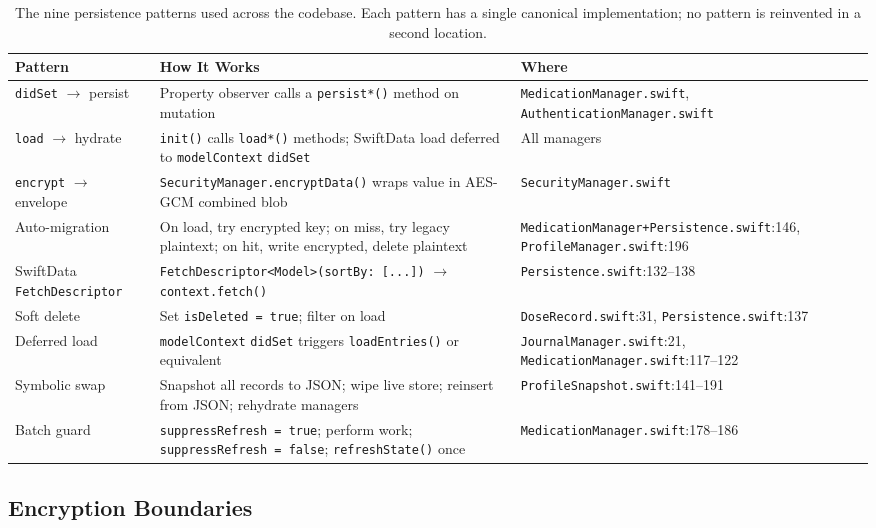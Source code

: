 \documentclass[11pt,a4paper]{article}
\newcommand{\code}[1]{\texttt{\small #1}}
\begin{document}
\begin{table}[h]
\centering
\small
\begin{tabular}{@{}p{3.0cm}p{6.0cm}p{5.5cm}@{}}
\toprule
\textbf{Pattern} & \textbf{How It Works} & \textbf{Where} \\
\midrule
\code{didSet} $\to$ persist &
  Property observer calls a \code{persist*()} method on mutation &
  \code{MedicationManager.swift},
  \code{AuthenticationManager.swift} \\
\code{load} $\to$ hydrate &
  \code{init()} calls \code{load*()} methods; SwiftData load deferred to
  \code{modelContext} \code{didSet} &
  All managers \\
\code{encrypt} $\to$ envelope &
  \code{SecurityManager.encryptData()} wraps value in AES-GCM combined blob &
  \code{SecurityManager.swift} \\
Auto-migration &
  On load, try encrypted key; on miss, try legacy plaintext; on hit,
  write encrypted, delete plaintext &
  \code{MedicationManager+Persistence.swift}:146,
  \code{ProfileManager.swift}:196 \\
SwiftData \code{FetchDescriptor} &
  \code{FetchDescriptor<Model>(sortBy: [...])} $\to$
  \code{context.fetch()} &
  \code{Persistence.swift}:132--138 \\
Soft delete &
  Set \code{isDeleted = true}; filter on load &
  \code{DoseRecord.swift}:31,
  \code{Persistence.swift}:137 \\
Deferred load &
  \code{modelContext} \code{didSet} triggers
  \code{loadEntries()} or equivalent &
  \code{JournalManager.swift}:21,
  \code{MedicationManager.swift}:117--122 \\
Symbolic swap &
  Snapshot all records to JSON; wipe live store; reinsert from JSON;
  rehydrate managers &
  \code{ProfileSnapshot.swift}:141--191 \\
Batch guard &
  \code{suppressRefresh = true}; perform work;
  \code{suppressRefresh = false}; \code{refreshState()}
  once &
  \code{MedicationManager.swift}:178--186 \\
\bottomrule
\end{tabular}
\caption{The nine persistence patterns used across the codebase. Each
pattern has a single canonical implementation; no pattern is reinvented in a
second location.}
\label{tab:patterns}
\end{table}

\subsection{Encryption Boundaries}
\label{sec:encryption_boundaries}
\end{document}
